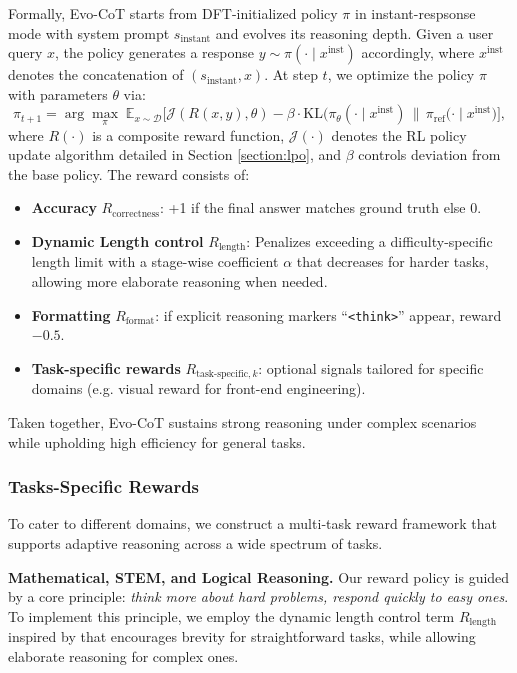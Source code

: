 \documentclass[table]{gtech}
\theoremstyle{definition}
\begin{document}
Formally, Evo-CoT starts from DFT-initialized policy $\pi$ in instant-respsonse mode with system prompt $s_{\text{instant}}$ and evolves its reasoning depth. Given a user query $x$, the policy generates a response $y \sim \pi(\cdot \mid x^{\text{inst}})$ accordingly, where $x^{\text{inst}}$ denotes the concatenation of $(s_{\text{instant}},x)$.
At step $t$, we optimize the policy $\pi$  with parameters $\theta$ via: 
$$\pi_{t+1} = \arg\max_{\pi} \; \mathbb{E}_{x \sim \mathcal{D}} \big[ \mathcal{J}(R(x,y), \theta) - \beta \cdot \mathrm{KL}\big(\pi_\theta(\cdot \mid x^{\text{inst}}) \,\big\|\, \pi_{\text{ref}}(\cdot \mid x^{\text{inst}}\big) \big],$$ 
where $R(\cdot)$ is a composite reward function, $\mathcal{J(\cdot)}$ denotes the RL policy update algorithm detailed in Section \ref{section:lpo}, and $\beta$ controls deviation from the base policy.
The reward consists of:
\begin{itemize}
    \item \textbf{Accuracy} $R_{\text{correctness}}$: +1 if the final answer matches ground truth else 0.
    \item \textbf{Dynamic Length control} $R_{\text{length}}$:  Penalizes exceeding a difficulty-specific length limit with a stage-wise coefficient $\alpha$ that decreases for harder tasks, allowing more elaborate reasoning when needed. 
    \item \textbf{Formatting} $R_{\text{format}}$: if explicit reasoning markers ``\texttt{<think>}'' appear, reward $-0.5$.
    \item \textbf{Task-specific rewards} $R_{\text{task-specific},k}$: optional signals tailored for specific domains (e.g. visual reward for front-end engineering).
\end{itemize}
Taken together, Evo-CoT sustains strong reasoning under complex scenarios while upholding high efficiency for general tasks.

\subsubsection{Tasks-Specific Rewards}
To cater to different domains, we construct a multi‑task reward framework that supports adaptive reasoning across a wide spectrum of tasks.

\textbf{Mathematical, STEM, and Logical Reasoning.}  
Our reward policy is guided by a core principle: \emph{think more about hard problems, respond quickly to easy ones}.  
To implement this principle, we employ the dynamic length control term $R_{\text{length}}$ inspired by \cite{team2025kimi} that encourages brevity for straightforward tasks, while allowing elaborate reasoning for complex ones.  
\end{document}
